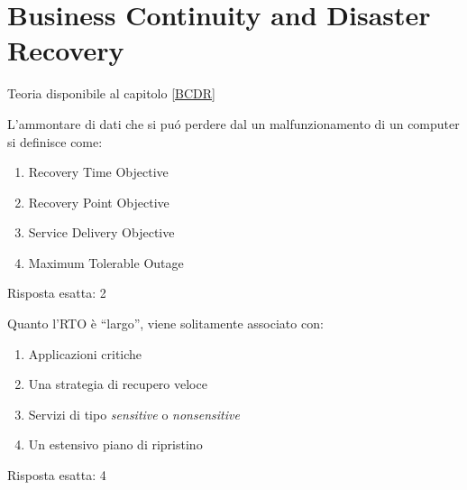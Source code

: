 \chapter{Business Continuity and Disaster Recovery}
\label{EsBCDR1}

Teoria disponibile al capitolo \ref{BCDR}

\begin{Exercise} [
  title={Definizioni},
  label={bcdr1}
 ]

 \Question L'ammontare di dati che si puó perdere dal un malfunzionamento di 
un computer si definisce come:
\begin{enumerate}
  \item Recovery Time Objective
  \item Recovery Point Objective
  \item Service Delivery Objective
  \item Maximum Tolerable Outage
\end{enumerate}

\end{Exercise}

\begin{Answer} [
   ref={bcdr1},
   number={1}
 ]

  \Question Risposta esatta: 2

\end{Answer}


\begin{Exercise} [
  title={RTO Largo},
  label={bcdr2}
 ]
 
 \Question Quanto l'RTO è ``largo'', viene solitamente associato con:
\begin{enumerate}
  \item Applicazioni critiche
  \item Una strategia di recupero veloce
  \item Servizi di tipo \textit{sensitive} o \textit{nonsensitive}
  \item Un estensivo piano di ripristino
\end{enumerate}

\end{Exercise}

\begin{Answer} [
   ref={bcdr2},
   number={2}
 ]

  \Question Risposta esatta: 4

\end{Answer}

